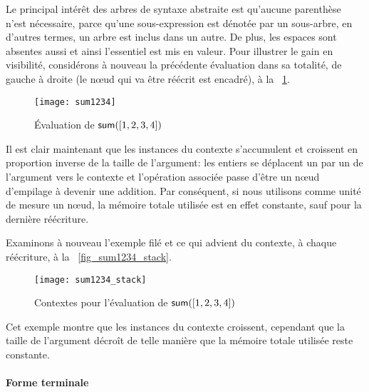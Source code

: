 Le principal intérêt des arbres de syntaxe abstraite est qu'aucune
parenthèse n'est nécessaire, parce qu'une sous-expression est dénotée
par un sous-arbre, en d'autres termes, un arbre est inclus dans un
autre. De plus, les espaces sont absentes aussi et ainsi l'essentiel
est mis en valeur. Pour illustrer le gain en visibilité, considérons à
nouveau la précédente évaluation dans sa totalité, de gauche à droite
(le n{\oe}ud qui va être réécrit est encadré), à la
\fig~\ref{fig_sum1234}.
\begin{figure}
\centering
\texttt{[image: sum1234]}
\caption{Évaluation de \(\textsf{sum}([1,2,3,4])\)\label{fig_sum1234}}
\end{figure}
Il est clair maintenant que les instances du contexte s'accumulent et
croissent en proportion inverse de la taille de l'argument: les
entiers se déplacent un par un de l'argument vers le contexte et
l'opération associée passe d'être un n{\oe}ud
d'empilage à devenir une addition. Par
conséquent, si nous utilisons comme unité de mesure un n{\oe}ud, la
mémoire totale utilisée est en effet constante, sauf pour la dernière
réécriture.

Examinons à nouveau l'exemple filé et ce qui advient du contexte, à
chaque réécriture, à la \fig~\vref{fig_sum1234_stack}.
\begin{figure}
\centering
\texttt{[image: sum1234\_stack]}
\caption{Contextes pour l'évaluation de \(\textsf{sum}([1,2,3,4])\)
\label{fig_sum1234_stack}}
\end{figure}
Cet exemple montre que les instances du contexte croissent, cependant
que la taille de l'argument décroît de telle manière que la mémoire
totale utilisée reste constante.



\paragraph{Forme terminale}
\label{sec_tail}

